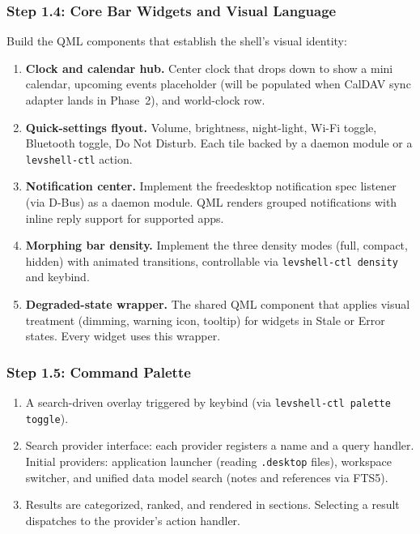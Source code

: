 \documentclass[11pt,a4paper]{article}
\begin{document}
\subsubsection{Step 1.4: Core Bar Widgets and Visual Language}

Build the QML components that establish the shell's visual identity:

\begin{enumerate}[leftmargin=1.5em, itemsep=2pt]
  \item \textbf{Clock and calendar hub.} Center clock that drops down to show a mini calendar, upcoming events placeholder (will be populated when CalDAV sync adapter lands in Phase~2), and world-clock row.
  \item \textbf{Quick-settings flyout.} Volume, brightness, night-light, Wi-Fi toggle, Bluetooth toggle, Do Not Disturb. Each tile backed by a daemon module or a \texttt{levshell-ctl} action.
  \item \textbf{Notification center.} Implement the freedesktop notification spec listener (via D-Bus) as a daemon module. QML renders grouped notifications with inline reply support for supported apps.
  \item \textbf{Morphing bar density.} Implement the three density modes (full, compact, hidden) with animated transitions, controllable via \texttt{levshell-ctl density} and keybind.
  \item \textbf{Degraded-state wrapper.} The shared QML component that applies visual treatment (dimming, warning icon, tooltip) for widgets in Stale or Error states. Every widget uses this wrapper.
\end{enumerate}

\subsubsection{Step 1.5: Command Palette}

\begin{enumerate}[leftmargin=1.5em, itemsep=2pt]
  \item A search-driven overlay triggered by keybind (via \texttt{levshell-ctl palette toggle}).
  \item Search provider interface: each provider registers a name and a query handler. Initial providers: application launcher (reading \texttt{.desktop} files), workspace switcher, and unified data model search (notes and references via FTS5).
  \item Results are categorized, ranked, and rendered in sections. Selecting a result dispatches to the provider's action handler.
\end{enumerate}
\end{document}
